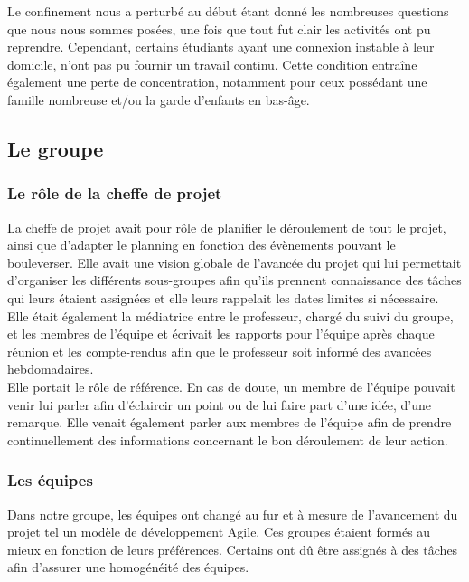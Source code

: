 \documentclass[a4paper,11pt]{article}
\begin{document}
Le confinement nous a perturbé au début étant donné les nombreuses questions que nous nous sommes posées, une fois que tout fut clair les activités ont pu reprendre. Cependant, certains étudiants ayant une connexion instable à leur domicile, n’ont pas pu fournir un travail continu. Cette condition entraîne également une perte de concentration, notamment pour ceux possédant une famille nombreuse et/ou la garde d’enfants en bas-âge.


\subsection{Le groupe}

\subsubsection{Le rôle de la cheffe de projet}

La cheffe de projet avait pour rôle de planifier le déroulement de tout le projet, ainsi que d'adapter le planning en fonction des évènements pouvant le bouleverser. Elle avait une vision globale de l’avancée du projet qui lui permettait d’organiser les différents sous-groupes afin qu’ils prennent connaissance des tâches qui leurs étaient assignées et elle leurs rappelait les dates limites si nécessaire. \\

Elle était également la médiatrice entre le professeur, chargé du suivi du groupe, et les membres de l’équipe et écrivait les rapports pour l’équipe après chaque réunion et les compte-rendus afin que le professeur soit informé des avancées hebdomadaires. \\
	
Elle portait le rôle de référence. En cas de doute, un membre de l’équipe pouvait venir lui parler afin d’éclaircir un point ou de lui faire part d’une idée, d’une remarque. Elle venait également parler aux membres de l’équipe afin de prendre continuellement des informations concernant le bon déroulement de leur action.

\subsubsection{Les équipes}


Dans notre groupe, les équipes ont changé au fur et à mesure de l’avancement du projet tel un modèle de développement Agile. Ces groupes étaient formés au mieux en fonction de leurs préférences. Certains ont dû être assignés à des tâches afin d’assurer une homogénéité des équipes. \\
\end{document}
